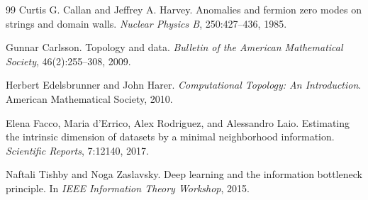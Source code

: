 \documentclass[11pt]{article}
\begin{document}
\begin{thebibliography}{99}
Curtis G. Callan and Jeffrey A. Harvey.
\newblock Anomalies and fermion zero modes on strings and domain walls.
\newblock \emph{Nuclear Physics B}, 250:427--436, 1985.

Gunnar Carlsson.
\newblock Topology and data.
\newblock \emph{Bulletin of the American Mathematical Society}, 46(2):255--308, 2009.

Herbert Edelsbrunner and John Harer.
\newblock \emph{Computational Topology: An Introduction}.
\newblock American Mathematical Society, 2010.

Elena Facco, Maria d'Errico, Alex Rodriguez, and Alessandro Laio.
\newblock Estimating the intrinsic dimension of datasets by a minimal neighborhood information.
\newblock \emph{Scientific Reports}, 7:12140, 2017.

Naftali Tishby and Noga Zaslavsky.
\newblock Deep learning and the information bottleneck principle.
\newblock In \emph{IEEE Information Theory Workshop}, 2015.

\end{thebibliography}
\end{document}
